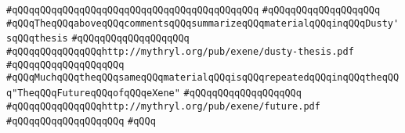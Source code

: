 \verb|#qQQqqQQqqQQqqQQqqQQqqQQqqQQqqQQqqQQq|\verb|qQQqqQQq|\newline
\verb|#qQQqqQQqqQQqqQQqqQQq|\newline
\verb|#qQQqTheqQQqaboveqQQqcommentsqQQqsummarizeqQQqmaterialqQQqinqQQqDusty'sqQQqthesis|\newline
\verb|#qQQqqQQqqQQqqQQqqQQq|\newline
\verb|#qQQqqQQqqQQqqQQqhttp://mythryl.org/pub/exene/dusty-thesis.pdf|\newline
\verb|#qQQqqQQqqQQqqQQqqQQq|\newline
\verb|#qQQqMuchqQQqtheqQQqsameqQQqmaterialqQQqisqQQqrepeatedqQQqinqQQqtheqQQq"TheqQQqFutureqQQqofqQQqeXene"|\newline
\verb|#qQQqqQQqqQQqqQQqqQQq|\newline
\verb|#qQQqqQQqqQQqqQQqhttp://mythryl.org/pub/exene/future.pdf|\newline
\verb|#qQQqqQQqqQQqqQQqqQQq|\newline
\verb|#qQQq|\newline
\newline

